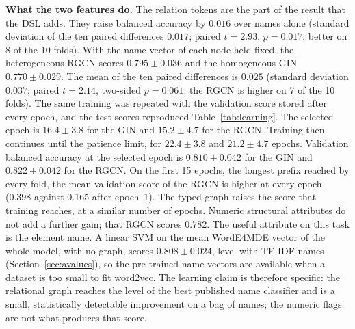 \documentclass[journal,article,submit,moreauthors,technologies]{Definitions/mdpi}
\newcommand{\rev}[1]{#1}
\begin{document}
\rev{\textbf{What the two features do.} The relation tokens are the part of the result that the DSL adds. They raise balanced accuracy by $0.016$ over names alone (standard deviation of the ten paired differences $0.017$; paired $t=2.93$, $p=0.017$; better on 8 of the 10 folds). With the name vector of each node held fixed, the heterogeneous RGCN scores $0.795\pm0.036$ and the homogeneous GIN $0.770\pm0.029$. The mean of the ten paired differences is $0.025$ (standard deviation $0.037$; paired $t=2.14$, two-sided $p=0.061$; the RGCN is higher on 7 of the 10 folds). The same training was repeated with the validation score stored after every epoch, and the test scores reproduced Table~\ref{tab:learning}. The selected epoch is $16.4\pm3.8$ for the GIN and $15.2\pm4.7$ for the RGCN. Training then continues until the patience limit, for $22.4\pm3.8$ and $21.2\pm4.7$ epochs. Validation balanced accuracy at the selected epoch is $0.810\pm0.042$ for the GIN and $0.822\pm0.042$ for the RGCN. On the first 15 epochs, the longest prefix reached by every fold, the mean validation score of the RGCN is higher at every epoch (0.398 against 0.165 after epoch~1). The typed graph raises the score that training reaches, at a similar number of epochs. Numeric structural attributes do not add a further gain; that RGCN scores $0.782$. The useful attribute on this task is the element name. A linear SVM on the mean WordE4MDE vector of the whole model, with no graph, scores \(0.808\pm0.024\), level with TF-IDF names (Section~\ref{sec:avalues}), so the pre-trained name vectors are available when a dataset is too small to fit word2vec. The learning claim is therefore specific: the relational graph reaches the level of the best published name classifier and is a small, statistically detectable improvement on a bag of names; the numeric flags are not what produces that score.}
\end{document}
